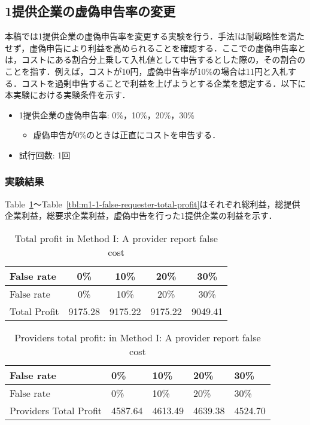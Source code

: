 \hypertarget{ux63d0ux4f9bux4f01ux696dux306eux865aux507dux7533ux544aux7387ux306eux5909ux66f4}{%
\subsection{1提供企業の虚偽申告率の変更}\label{ux63d0ux4f9bux4f01ux696dux306eux865aux507dux7533ux544aux7387ux306eux5909ux66f4}}

本稿では1提供企業の虚偽申告率を変更する実験を行う．手法Iは耐戦略性を満たせず，虚偽申告により利益を高められることを確認する．ここでの虚偽申告率とは，コストにある割合分上乗して入札値として申告するとした際の，その割合のことを指す．例えば，コストが10円，虚偽申告率が10\%の場合は11円と入札する．コストを過剰申告することで利益を上げようとする企業を想定する．以下に本実験における実験条件を示す．

\begin{itemize}
\tightlist
\item
  1提供企業の虚偽申告率: 0\%，10\%，20\%，30\%

  \begin{itemize}
  \tightlist
  \item
    虚偽申告が0\%のときは正直にコストを申告する．
  \end{itemize}
\item
  試行回数: 1回
\end{itemize}

\hypertarget{ux5b9fux9a13ux7d50ux679c}{%
\subsubsection{実験結果}\label{ux5b9fux9a13ux7d50ux679c}}

Table~\ref{tbl:m1-1-total-profit}〜Table~\ref{tbl:m1-1-false-requester-total-profit}はそれぞれ総利益，総提供企業利益，総要求企業利益，虚偽申告を行った1提供企業の利益を示す．

\hypertarget{tbl:m1-1-total-profit}{}
\begin{longtable}[H]{@{}lcccc@{}}
\caption{\label{tbl:m1-1-total-profit}Total profit in Method I: A provider report false cost}\tabularnewline
\toprule
False rate & 0\% & 10\% & 20\% & 30\%\tabularnewline
\midrule
\endfirsthead
\toprule
False rate & 0\% & 10\% & 20\% & 30\%\tabularnewline
\midrule
\endhead
Total Profit & 9175.28 & 9175.22 & 9175.22 & 9049.41\tabularnewline
\bottomrule
\end{longtable}

\hypertarget{tbl:m1-1-providers-total-profit}{}
\begin{longtable}[H]{@{}lllll@{}}
\caption{\label{tbl:m1-1-providers-total-profit}Providers total profit: in Method I: A provider report false cost}\tabularnewline
\toprule
False rate & 0\% & 10\% & 20\% & 30\%\tabularnewline
\midrule
\endfirsthead
\toprule
False rate & 0\% & 10\% & 20\% & 30\%\tabularnewline
\midrule
\endhead
Providers Total Profit & 4587.64 & 4613.49 & 4639.38 &
4524.70\tabularnewline
\bottomrule
\end{longtable}

